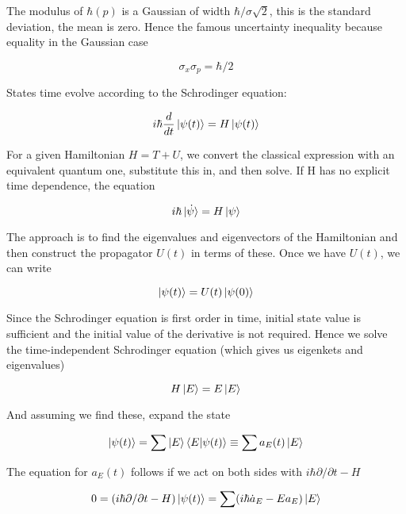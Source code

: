 \documentclass{tufte-book}
\begin{document}
The modulus of $\hbar(p)$ is a Gaussian of width $\hbar/\sigma\sqrt{2}$, this is the standard deviation, the mean is zero. Hence the famous uncertainty inequality because equality in the Gaussian case

\begin{equation}
	\label{eq:43}
	\sigma_x\sigma_p = \hbar/2
\end{equation}

States time evolve according to the Schrodinger equation:

\begin{equation}
	\label{eq:tdse}
	i\hbar\frac{d}{dt}\ket{\psi(t)} = H\ket{\psi(t)}
\end{equation}

For a given Hamiltonian $H = T + U$, we convert the classical expression with an equivalent quantum one, substitute this in, and then solve. If H has no explicit time dependence, the equation

\begin{equation}
	\label{eq:s1}
	i\hbar\ket{\dot{\psi}} = H\ket{\psi}
\end{equation}

The approach is to find the eigenvalues and eigenvectors of the Hamiltonian and then construct the propagator $U(t)$ in terms of these. Once we have $U(t)$, we can write

\begin{equation}
	\label{eq:s2}
	\ket{\psi(t)} = U(t)\ket{\psi(0)}
\end{equation}

Since the Schrodinger equation is first order in time, initial state value is sufficient and the initial value of the derivative is not required. Hence we solve the time-independent Schrodinger equation (which gives us eigenkets and eigenvalues)

\begin{equation}
	\label{eq:tise}
	H\ket{E} = E\ket{E}
\end{equation}

And assuming we find these, expand the state

\begin{equation}
	\label{eq:s3}
	\ket{\psi(t)} = \sum\ket{E}\braket{E|\psi(t)} \equiv \sum a_E(t)\ket{E}
\end{equation}

The equation for $a_E(t)$ follows if we act on both sides with $i\hbar\partial/\partial t - H$

\begin{equation}
	0 = (i\hbar\partial/\partial t - H)\ket{\psi(t)} = \sum(i\hbar\dot{a}_E - Ea_E)\ket{E}
\end{equation}
\end{document}
